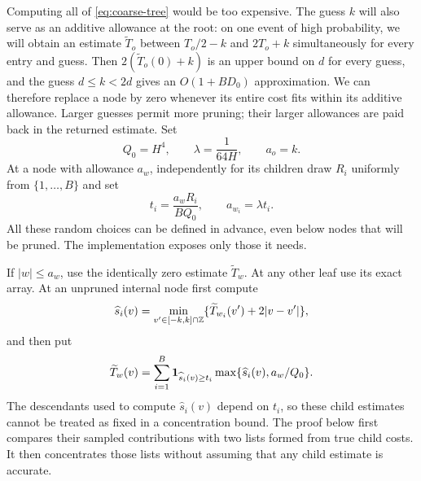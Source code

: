 Computing all of \eqref{eq:coarse-tree} would be too expensive. The guess
$k$ will also serve as an additive allowance at the root: on one event
of high probability, we will obtain an estimate $\widetilde T_o$ between $T_o/2-k$ and
$2T_o+k$ simultaneously for every entry and guess. Then
$2(\widetilde T_o(0)+k)$ is an upper bound on $d$ for every guess,
and the guess $d\le k<2d$ gives an $O(1+BD_0)$ approximation.
We can therefore replace a node by zero whenever its entire cost fits
within its additive allowance. Larger guesses permit more pruning;
their larger allowances are paid back in the returned estimate. Set
\[
 Q_0=H^4,\qquad \lambda=\frac1{64H},\qquad a_o=k.
\]
At a node with allowance $a_w$, independently for its children draw
$R_i$ uniformly from $\{1,\ldots,B\}$ and set
\begin{equation}\label{eq:coarse-threshold}
 t_i=\frac{a_wR_i}{BQ_0},\qquad a_{w_i}=\lambda t_i.
\end{equation}
All these random choices can be defined in advance, even below nodes that
will be pruned.  The implementation exposes only those it needs.

If $|w|\le a_w$, use the identically zero estimate $\widetilde T_w$.  At any
other leaf use its exact array.  At an unpruned internal node first compute
\[
 \widehat s_i(v)=\min_{v'\in[-k,k]\cap\mathbb Z}
       \{\widetilde T_{w_i}(v')+2|v-v'|\},
\]
and then put
\begin{equation}\label{eq:coarse-estimate}
 \widetilde T_w(v)=\sum_{i=1}^B
     \boldsymbol 1_{\widehat s_i(v)\ge t_i}
     \max\{\widehat s_i(v),a_w/Q_0\}.
\end{equation}
The descendants used to compute $\widehat s_i(v)$ depend on $t_i$, so
these child estimates cannot be treated as fixed in a concentration
bound. The proof below first compares their sampled contributions with
two lists formed from true child costs. It then concentrates those lists
without assuming that any child estimate is accurate.

